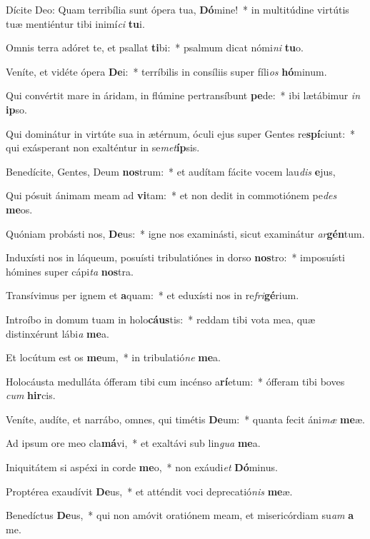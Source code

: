 \item Dícite Deo: Quam terribília sunt ópera tua, \textbf{Dó}mine!~* in multitúdine virtútis tuæ mentiéntur tibi inimí\textit{ci} \textbf{tu}i.
\item Omnis terra adóret te, et psallat \textbf{ti}bi:~* psalmum dicat nómi\textit{ni} \textbf{tu}o.
\item Veníte, et vidéte ópera \textbf{De}i:~* terríbilis in consíliis super fíli\textit{os} \textbf{hó}minum.
\item Qui convértit mare in áridam, in flúmine pertransíbunt \textbf{pe}de:~* ibi lætábimur \textit{in} \textbf{ip}so.
\item Qui dominátur in virtúte sua in ætérnum, óculi ejus super Gentes re\textbf{spí}ciunt:~* qui exásperant non exalténtur in se\textit{met}\textbf{íp}sis.
\item Benedícite, Gentes, Deum \textbf{nos}trum:~* et audítam fácite vocem lau\textit{dis} \textbf{e}jus,
\item Qui pósuit ánimam meam ad \textbf{vi}tam:~* et non dedit in commotiónem pe\textit{des} \textbf{me}os.
\item Quóniam probásti nos, \textbf{De}us:~* igne nos examinásti, sicut examinátur \textit{ar}\textbf{gén}tum.
\item Induxísti nos in láqueum, posuísti tribulatiónes in dorso \textbf{nos}tro:~* imposuísti hómines super cápi\textit{ta} \textbf{nos}tra.
\item Transívimus per ignem et \textbf{a}quam:~* et eduxísti nos in re\textit{fri}\textbf{gé}rium.
\item Introíbo in domum tuam in holo\textbf{cáus}tis:~* reddam tibi vota mea, quæ distinxérunt lábi\textit{a} \textbf{me}a.
\item Et locútum est os \textbf{me}um,~* in tribulatió\textit{ne} \textbf{me}a.
\item Holocáusta medulláta ófferam tibi cum incénso a\textbf{rí}etum:~* ófferam tibi boves \textit{cum} \textbf{hir}cis.
\item Veníte, audíte, et narrábo, omnes, qui timétis \textbf{De}um:~* quanta fecit áni\textit{mæ} \textbf{me}æ.
\item Ad ipsum ore meo cla\textbf{má}vi,~* et exaltávi sub lin\textit{gua} \textbf{me}a.
\item Iniquitátem si aspéxi in corde \textbf{me}o,~* non exáudi\textit{et} \textbf{Dó}minus.
\item Proptérea exaudívit \textbf{De}us,~* et atténdit voci deprecatió\textit{nis} \textbf{me}æ.
\item Benedíctus \textbf{De}us,~* qui non amóvit oratiónem meam, et misericórdiam su\textit{am} \textbf{a} me.
